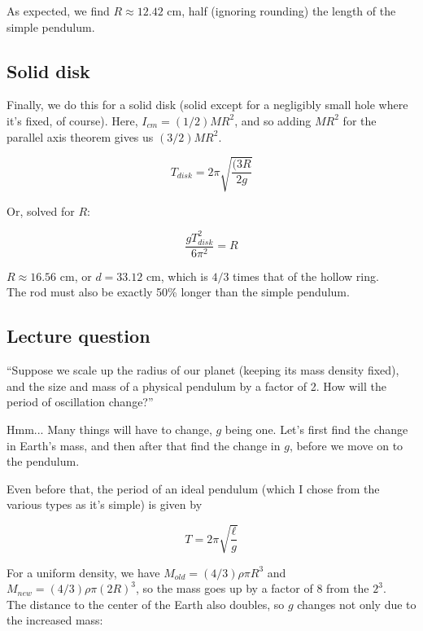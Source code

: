 As expected, we find $R \approx 12.42$ cm, half (ignoring rounding) the length of the simple pendulum. 

\subsection{Solid disk}

Finally, we do this for a solid disk (solid except for a negligibly small hole where it's fixed, of course). Here, $I_{cm} = (1/2) M R^2$, and so adding $M R ^2$ for the parallel axis theorem gives us $(3/2) M R^2$.

\begin{equation}
T_{disk} = 2 \pi \sqrt{\frac{(3R}{2g}}
\end{equation}

Or, solved for $R$:

\begin{equation}
\frac{g T_{disk}^2}{6 \pi^2} = R
\end{equation}

$R \approx 16.56$ cm, or $d = 33.12$ cm, which is $4/3$ times that of the hollow ring.\\
The rod must also be exactly 50\% longer than the simple pendulum.

\subsection{Lecture question}

``Suppose we scale up the radius of our planet (keeping its mass density fixed), and the size and mass of a physical pendulum by a factor of 2. How will the period of oscillation change?''

Hmm... Many things will have to change, $g$ being one. Let's first find the change in Earth's mass, and then after that find the change in $g$, before we move on to the pendulum.

Even before that, the period of an ideal pendulum (which I chose from the various types as it's simple) is given by

\begin{equation}
T = 2 \pi \sqrt{\frac{\ell}{g}}
\end{equation}

For a uniform density, we have $M_{old} = (4/3) \rho \pi R^3$ and $M_{new} = (4/3) \rho \pi (2R)^3$, so the mass goes up by a factor of 8 from the $2^3$.\\
The distance to the center of the Earth also doubles, so $g$ changes not only due to the increased mass:

